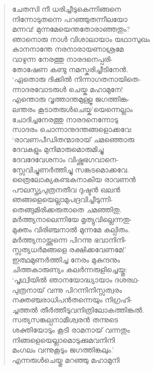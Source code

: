 \begin{verse}
ചേതസി നീ ധരിച്ചീടുകെന്നിങ്ങനെ\\
നിന്നോടുതന്നെ പറഞ്ഞുതന്നീലയോ\\
മന്നവ! മുന്നമേയെന്തതോരാഞ്ഞതും?\\
ഞാനൊരു നാള്‍ വിശാലായാം യഥാസുഖം\\
കാനനാന്തേ നരനാരായണാശ്രമേ\\
വാഴുന്ന നേരത്തു നാരദനെപ്പരി-\\
തോഷേണ കണ്ടു നമസ്കരിച്ചീടിനേന്‍.\\
‘ഏതൊരു ദിക്കില്‍ നിന്നാഗതനായിതെ-\\
ന്നാദരവോടരുള്‍ ചെയ്ക മഹാമുനേ!\\
എന്തൊരു വൃത്താന്തമുള്ളൂ ജഗത്തിങ്ക-\\
ലന്തരം കൂടാതരുള്‍ചെയ്ക’യെന്നെല്ലാം\\
ചോദിച്ചനേരത്തു നാരദനെന്നോടു\\
സാദരം ചൊന്നാനുദന്തങ്ങളൊക്കവേ:\\
‘രാവണപീഡിതന്മാരായ് ചമഞ്ഞൊരു\\
ദേവകളും മുനിമാരുമൊരുമിച്ചു\\
ദേവദേവേശനാം വിഷ്ണുഭഗവാനെ-\\
സ്സേവിച്ചുണര്‍ത്തിച്ചു സങ്കടമൊക്കവേ.\\
ത്രൈലോക്യകണ്ടകനാകിയ രാവണന്‍\\
പൗലസ്ത്യപുത്രനതീവ ദുഷ്ടന്‍ ഖലന്‍\\
ഞങ്ങളെയെല്ലാമുപദ്രവിച്ചീടുന്നി-\\
തെങ്ങുമിരിക്കരുതാതെ ചമഞ്ഞിതു.\\
മര്‍ത്ത്യനാലെന്നിയേ മൃത്യുവില്ലെന്നതു-\\
മുക്തം വിരിഞ്ചനാല്‍ മുന്നമേ കല്പിതം.\\
മര്‍ത്ത്യനായ്ത്തന്നെ പിറന്നു ഭവാനിനി-\\
സ്സത്യധര്‍മങ്ങളെ രക്ഷിക്കവേണമേ!’\\
ഇത്ഥമുണര്‍ത്തിച്ച നേരം മുകുന്ദനും\\
ചിത്തകാരുണ്യം കലര്‍ന്നരുളിച്ചെയ്തു:\\
‘പൃഥ്വിയില്‍ ഞാനയോദ്ധ്യായാം ദശരഥ-\\
പുത്രനായ് വന്നു പിറന്നിനിസ്സത്വരം\\
നക്തഞ്ചരാധിപന്‍തന്നെയും നിഗ്രഹി-\\
ച്ചത്തല്‍ തീര്‍ത്തീടുവനിത്രിലോകത്തിങ്കല്‍.\\
സത്യസങ്കല്പനാമീശ്വരന്‍ തന്നുടെ\\
ശക്തിയോടും കൂടി രാമനായ് വന്നതും\\
നിങ്ങളെയെല്ലാമൊടുക്കുമവനിനി\\
മംഗലം വന്നുകൂടും ജഗത്തിങ്കലും.’\\
എന്നരുള്‍ചെയ്തു മറഞ്ഞു മഹാമുനി\\

\end{verse}

